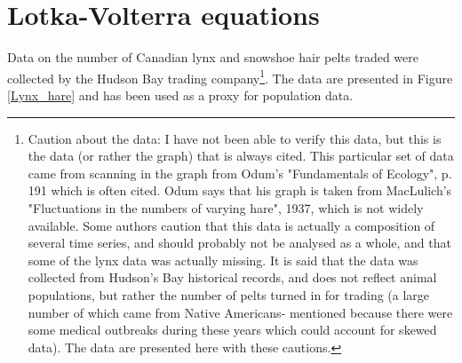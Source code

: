 \documentclass[]{article}
\newcommand{\fig}[1]{Figure \ref{#1}}
\begin{document}
\section{Lotka-Volterra equations}\label{Lotka-Volterra equations}
Data on the number of Canadian lynx and snowshoe hair pelts traded were collected by the  Hudson Bay trading company\footnote{Caution about the data: I have not been able to verify this data, but this is the data (or rather the graph) that is always cited. This particular set of data came from scanning in the graph from Odum's "Fundamentals of Ecology", p. 191 which is often cited. Odum says that his graph is taken from MacLulich's "Fluctuations in the numbers of varying hare", 1937, which is not widely available. Some authors caution that this data is actually a composition of several time series, and should probably not be analysed as a whole, and that some of the lynx data was actually missing. It is said that the data was collected from Hudson's Bay historical records, and does not reflect animal populations, but rather the number of pelts turned in for trading (a large number of which came from Native Americans- mentioned because there were some medical outbreaks during these years which could account for skewed data). The data are presented here with these cautions. }. The data are presented in \fig{Lynx_hare} and has been used as a proxy for population data.
\end{document}
